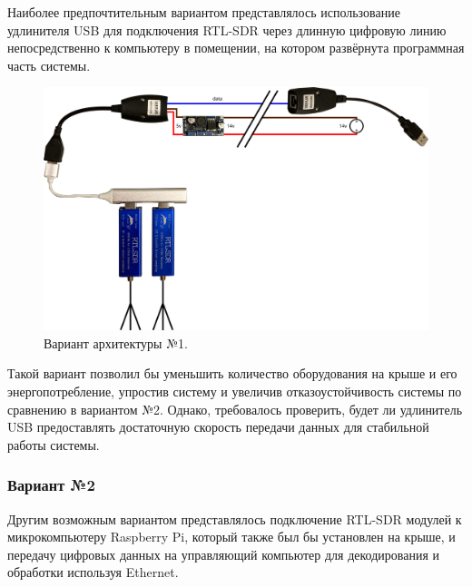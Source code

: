 \documentclass[a4paper, 14pt, titlepage, fleqn]{extarticle}
\begin{document}
	Наиболее предпочтительным вариантом представлялось использование удлинителя USB для подключения RTL-SDR через длинную цифровую линию непосредственно к компьютеру в помещении, на котором развёрнута программная часть системы.
	
	\begin{figure}[H]
		\centering
		\includegraphics[width=\textwidth]{plana.png}
		\caption{Вариант архитектуры №1.}
	\end{figure}
	
	Такой вариант позволил бы уменьшить количество оборудования на крыше и его энергопотребление, упростив систему и увеличив отказоустойчивость системы по сравнению в вариантом №2. Однако, требовалось проверить, будет ли удлинитель USB предоставлять достаточную скорость передачи данных для стабильной работы системы.
	
	\subsubsection*{Вариант №2}
	
	Другим возможным вариантом представлялось подключение RTL-SDR модулей к микрокомпьютеру Raspberry Pi, который также был бы установлен на крыше, и передачу цифровых данных на управляющий компьютер для декодирования и обработки используя Ethernet.
	
\end{document}
